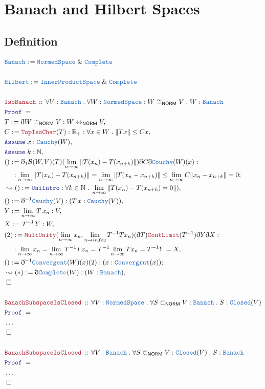 \documentclass[12pt]{scrartcl}
\newcommand{\TYPE}[1]{\textcolor{NavyBlue}{\mathtt{#1}}}
\newcommand{\LOGIC}[1]{\textcolor{Blue}{\mathtt{#1}}}
\newcommand{\THM}[1]{\textcolor{Maroon}{\mathtt{#1}}}
\renewcommand{\.}{\; . \;}
\newcommand{\de}{: \kern 0.1pc =}
\newcommand{\Theorem}[2]{& \THM{#1} \, :: \, #2 \\ & \Proof = \\ }
\newcommand{\NewLine}{\\ & \kern 1pc}
\newcommand{\Page}[1]{\begin{align*} #1 \end{align*} \newpage   }
\newcommand{ \bd }{ \ByDef }
\newcommand{\NoProof}{ & \ldots \\ \EndProof}
\renewcommand{\And}{\; \& \;}
\newcommand{\Reals}{\mathbb{R} }
\newcommand{\Nat}{\mathbb{N} }
\newcommand{\ToBij}{\leftrightarrow}
\newcommand{\Say}[3]{& #1 \de #2 : #3, \\}
\newcommand{\Conclude}[3]{& #1 \de #2 : #3; \\}
\newcommand{\Derive}[3]{& \leadsto #1 \de #2 : #3, \\}
\newcommand{\A}{\LOGIC{Assume} \;}
\newcommand{\Assume}[2]{& \A #1 : #2, \\}
\newcommand{\QED}{\; \square}
\newcommand{\EndProof}{& \QED \\}
\newcommand{\ByDef}{\eth}
\newcommand{\Proof}{\LOGIC{Proof} \; }
\newcommand{\NS}{\TYPE{NormedSpace}}
\newcommand{\Banach}{\TYPE{Banach}}
\newcommand{\IPS}{\TYPE{InnerProductSpace}}
\newcommand{\NORM}{\textsf{NORM}}
\newcommand{\B}{\mathcal{B}}
\begin{document}
\section{Banach and Hilbert Spaces}
\subsection{Definition}
\Page{
& \TYPE{Banach} \de \NS  \And  \TYPE{Complete}
\\ \\
& \TYPE{Hilbert} \de \IPS \And \TYPE{Complete}
\\ \\
\Theorem{IsoBanach}{ 
\forall V : \Banach \. \forall W : \NS : W \cong_{\NORM} V \. W : \Banach
}
\Say{T}{\bd W \cong_{\NORM} V }{ W \ToBij_{\NORM} V }
\Say{C}{\THM{TopIsoChar}(T)}{ \Reals_+ : \forall x \in W \. \|T x \| \le C x}
\Assume{x}{\TYPE{Cauchy}(W)}
\Assume{k}{\Nat}
\Conclude{()}{ \ByDef_1 \B(W,V)(T)(\lim_{n \to \infty} \| T(x_n) -  T(x_{n + k}) \|)
 \ByDef C \ByDef \TYPE{Couchy}(W) (x)
 }{ \NewLine : \lim_{n \to \infty} \| T(x_n) -  T(x_{n + k}) \|  = 
 \lim_{n \to \infty} \| T(x_n - x_{n + k}) \| \le 
 \lim_{n \to \infty}  C\| x_n - x_{n + k} \| =  0
}
\Derive{()}{\LOGIC{UniIntro}}{\forall k \in \Nat \. \lim_{n \to \infty} \| T(x_n) -  T(x_{n + k}) = 0 \|) } 
\Say{()}{\bd^{-1}\TYPE{Cauchy}(V)}{(T\, x : \TYPE{Cauchy}(V))}
\Say{Y}{\lim_{n \to \infty} T \, x_n}{V}
\Say{X}{T^{-1} \, Y}{W}
\Say{(2)}{\THM{MultUnity}(\lim_{n \to \infty} x_n ,\lim_{n \to infty} T^{-1} T x_n)(\ByDef T)
\THM{ContLimit}(T^{-1}) \ByDef Y \ByDef X
: \NewLine}
{\lim_{n \to \infty} x_n = \lim_{n \to \infty} T^{-1} T x_n 
= T^{-1} \lim_{n \to \infty} T x_n = T^{-1} Y = X
}
\Conclude{()}{\bd^{-1}\TYPE{Convergent}(W)(x)(2)}{(x : \TYPE{Convergrnt}(x))}
\Derive{(*)}{\bd \TYPE{Complete}(W)}{(W : \Banach)}
\EndProof
\\
\Theorem{BanachSubspaceIsClosed}{\forall V : \NS \. \forall S \subset_{\NORM} V : \Banach \. 
S : \TYPE{Closed}(V)
}
\NoProof
\\
\Theorem{BanachSubspaceIsClosed}{\forall V : \Banach \. \forall S \subset_{\NORM} V : \TYPE{Closed}(V) \. 
S : \Banach
}
\NoProof
}
\end{document}
